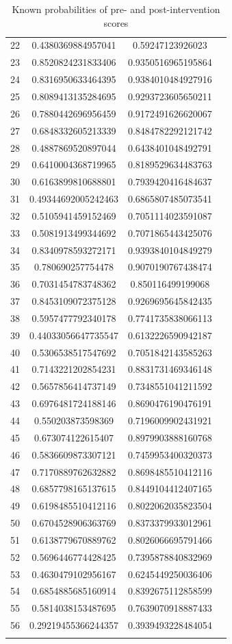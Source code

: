 \documentclass[10pt]{article}
\begin{document}
\begin{longtable}{|c|c|c|c|}
22 & 0.4380369884957041 & 0.59247123926023 \\
23 & 0.8520824231833406 & 0.9350516965195864 \\
24 & 0.8316950633464395 & 0.9384010484927916 \\
25 & 0.8089413135284695 & 0.9293723605650211 \\
26 & 0.7880442696956459 & 0.9172491626620067 \\
27 & 0.6848332605213339 & 0.8484782292121742 \\
28 & 0.4887869520897044 & 0.6438401048492791 \\
29 & 0.6410004368719965 & 0.8189529634483763 \\
30 & 0.6163899810688801 & 0.7939420416484637 \\
31 & 0.49344692005242463 & 0.6865807485073541 \\
32 & 0.5105941459152469 & 0.7051114023591087 \\
33 & 0.5081913499344692 & 0.7071865443425076 \\
34 & 0.8340978593272171 & 0.9393840104849279 \\
35 & 0.780690257754478 & 0.9070190767438474 \\
36 & 0.7031454783748362 & 0.850116499199068 \\
37 & 0.8453109072375128 & 0.9269695645842435 \\
38 & 0.5957477792340178 & 0.7741735838066113 \\
39 & 0.44033056647735547 & 0.6132226590942187 \\
40 & 0.5306538517547692 & 0.7051842143585263 \\
41 & 0.7143221202854231 & 0.8831731469346148 \\
42 & 0.5657856414737149 & 0.7348551041211592 \\
43 & 0.6976481724188146 & 0.8690476190476191 \\
44 & 0.550203873598369 & 0.7196009902431921 \\
45 & 0.673074122615407 & 0.8979903888160768 \\
46 & 0.5836609873307121 & 0.7459953400320373 \\
47 & 0.7170889762632882 & 0.8698485510412116 \\
48 & 0.6857798165137615 & 0.8449104412407165 \\
49 & 0.6198485510412116 & 0.8022062035823504 \\
50 & 0.6704528906363769 & 0.8373379933012961 \\
51 & 0.6138779670889762 & 0.8026066695791466 \\
52 & 0.5696446774428425 & 0.7395878840832969 \\
53 & 0.4630479102956167 & 0.6245449250036406 \\
54 & 0.6854885685160914 & 0.8392675112858599 \\
55 & 0.5814038153487695 & 0.7639070918887433 \\
56 & 0.29219455366244357 & 0.3939493228484054 \\
\hline
\caption{Known probabilities of pre- and post-intervention scores}
\label{BernoulliProbabilitiesPrePost}
\end{longtable}
\end{document}

